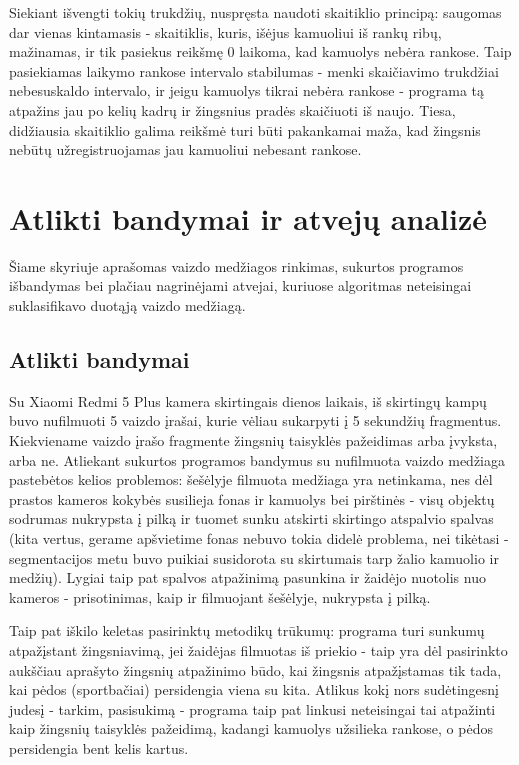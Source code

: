 \documentclass{VUMIFPSkursinis}
\begin{document}
Siekiant išvengti tokių trukdžių, nuspręsta naudoti skaitiklio principą: saugomas dar vienas kintamasis - skaitiklis, kuris, išėjus kamuoliui iš rankų ribų, mažinamas, ir tik pasiekus reikšmę 0 laikoma, kad kamuolys nebėra rankose. Taip pasiekiamas laikymo rankose intervalo stabilumas - menki skaičiavimo trukdžiai nebesuskaldo intervalo, ir jeigu kamuolys tikrai nebėra rankose - programa tą atpažins jau po kelių kadrų ir žingsnius pradės skaičiuoti iš naujo. Tiesa, didžiausia skaitiklio galima reikšmė turi būti pakankamai maža, kad žingsnis nebūtų užregistruojamas jau kamuoliui nebesant rankose. 

\section{Atlikti bandymai ir atvejų analizė}
Šiame skyriuje aprašomas vaizdo medžiagos rinkimas, sukurtos programos išbandymas bei plačiau nagrinėjami atvejai, kuriuose algoritmas neteisingai suklasifikavo duotąją vaizdo medžiagą. 
\subsection{Atlikti bandymai}
Su Xiaomi Redmi 5 Plus kamera skirtingais dienos laikais, iš skirtingų kampų buvo nufilmuoti 5 vaizdo įrašai, kurie vėliau sukarpyti į 5 sekundžių fragmentus. Kiekviename vaizdo įrašo fragmente žingsnių taisyklės pažeidimas arba įvyksta, arba ne. Atliekant sukurtos programos bandymus su nufilmuota vaizdo medžiaga pastebėtos kelios problemos: šešėlyje filmuota medžiaga yra netinkama, nes dėl prastos kameros kokybės susilieja fonas ir kamuolys bei pirštinės - visų objektų sodrumas nukrypsta į pilką ir tuomet sunku atskirti skirtingo atspalvio spalvas (kita vertus, gerame apšvietime fonas nebuvo tokia didelė problema, nei tikėtasi - segmentacijos metu buvo puikiai susidorota su skirtumais tarp žalio kamuolio ir medžių). Lygiai taip pat spalvos atpažinimą pasunkina ir žaidėjo nuotolis nuo kameros - prisotinimas, kaip ir filmuojant šešėlyje, nukrypsta į pilką. 


Taip pat iškilo keletas pasirinktų metodikų trūkumų: programa turi sunkumų atpažįstant žingsniavimą, jei žaidėjas filmuotas iš priekio - taip yra dėl pasirinkto aukščiau aprašyto žingsnių atpažinimo būdo, kai žingsnis atpažįstamas tik tada, kai pėdos (sportbačiai) persidengia viena su kita. Atlikus kokį nors sudėtingesnį judesį - tarkim, pasisukimą - programa taip pat linkusi neteisingai tai atpažinti kaip žingsnių taisyklės pažeidimą, kadangi kamuolys užsilieka rankose, o pėdos persidengia bent kelis kartus. 
\end{document}

